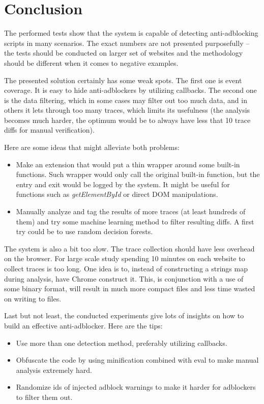 \section{Conclusion}

The performed tests show that the system is capable of detecting anti-adblocking scripts in many scenarios.
The exact numbers are not presented purposefully -- the tests should be conducted on larger set of websites
and the methodology should be different when it comes to negative examples.

The presented solution certainly has some weak spots. The first one is event coverage. It is easy to hide anti-adblockers
by utilizing callbacks. The second one is the data filtering, which in some cases may filter out too much data,
and in others it lets through too many traces, which limits its usefulness (the analysis becomes much harder,
the optimum would be to always have less that 10 trace diffs for manual verification).

Here are some ideas that might alleviate both problems:
\begin{itemize}
  \item Make an extension that would put a thin wrapper around some built-in functions. Such wrapper would only
           call the original built-in function, but the entry and exit would be logged by the system.
           It might be useful for functions such as \emph{getElementById} or direct DOM manipulations.
  \item Manually analyze and tag the results of more traces (at least hundreds of them) 
           and try some machine learning method to filter
           resulting diffs. A first try could be to use random decision forests.
\end{itemize}

The system is also a bit too slow. The trace collection should have less overhead on the browser. For large scale study
spending 10 minutes on each website to collect traces is too long.
One idea is to, instead of constructing a strings map during analysis, have
Chrome construct it. This, is conjunction with a use of some binary format, will
result in much more compact files and less time wasted on writing to files.

Last but not least, the conducted experiments give lots of insights on how to build an effective anti-adblocker.
Here are the tips:
\begin{itemize}
  \item Use more than one detection method, preferably utilizing callbacks.
  \item Obfuscate the code by using minification combined with eval to make manual analysis extremely hard.
  \item Randomize ids of injected adblock warnings to make it harder for adblockers to filter them out.
\end{itemize}
